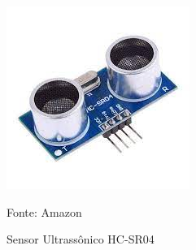 \begin{figure}[H]
    \caption{Sensor Ultrassônico HC-SR04}
    \label{fig:sensorImagem}
    \begin{center}
        
        \includegraphics[scale=1]{Textuais/imagens/sensor.png}
        
        Fonte: Amazon
    \end{center}
\end{figure}
